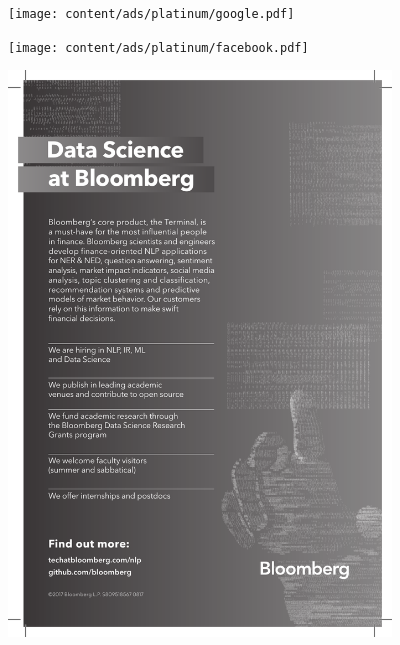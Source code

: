 \thispagestyle{empty}
\begin{center}
  \vfill
  \texttt{[image: content/ads/platinum/google.pdf]}
  \vfill
\end{center}
\clearpage


\thispagestyle{empty}
\begin{center}
  \vfill
  \texttt{[image: content/ads/platinum/facebook.pdf]}
  \vfill
\end{center}
\clearpage

\thispagestyle{empty}
\begin{center}
  \vfill
  \includegraphics[width=4in]{content/ads/platinum/bloomberg.pdf}
  \vfill
\end{center}
\clearpage
